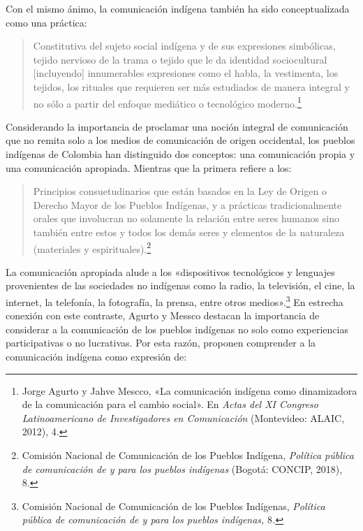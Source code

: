 \documentclass{tufte-handout}
\begin{document}
\noindent Con el mismo ánimo, la comunicación indígena también ha sido
conceptualizada como una práctica:

\begin{quote}
Constitutiva del sujeto social indígena y de sus expresiones simbólicas,
tejido nervioso de la trama o tejido que le da identidad sociocultural
{[}incluyendo{]} innumerables expresiones como el habla, la vestimenta,
los tejidos, los rituales que requieren ser más estudiados de manera
integral y no sólo a partir del enfoque mediático o tecnológico
moderno.\footnote{Jorge Agurto y Jahve Mescco, «La comunicación indígena
  como dinamizadora de la comunicación para el cambio social». En
  \emph{Actas del XI Congreso Latinoamericano de Investigadores en
  Comunicación} (Montevideo: ALAIC, 2012), 4.}
\end{quote}

\noindent Considerando la importancia de proclamar una noción integral de
comunicación que no remita solo a los medios de comunicación de origen
occidental, los pueblos indígenas de Colombia han distinguido dos
conceptos: una comunicación propia y una comunicación apropiada.
Mientras que la primera refiere a los:

\begin{quote}
Principios consuetudinarios que están basados en la Ley de Origen o
Derecho Mayor de los Pueblos Indígenas, y a prácticas tradicionalmente
orales que involucran no solamente la relación entre seres humanos sino
también entre estos y todos los demás seres y elementos de la naturaleza
(materiales y espirituales).\footnote{Comisión Nacional de Comunicación
  de los Pueblos Indígena, \emph{Política pública de comunicación de y
  para los pueblos indígenas} (Bogotá: CONCIP, 2018), 8.}
\end{quote}

\noindent La comunicación apropiada alude a los «dispositivos tecnológicos y
lenguajes provenientes de las sociedades no indígenas como la radio, la
televisión, el cine, la internet, la telefonía, la fotografía, la
prensa, entre otros medios».\footnote{Comisión Nacional de Comunicación
  de los Pueblos Indígenas, \emph{Política pública de comunicación de y
  para los pueblos indígenas,} 8\emph{.}} En estrecha conexión con este
contraste, Agurto y Messco destacan la importancia de considerar a la
comunicación de los pueblos indígenas no solo como experiencias
participativas o no lucrativas. Por esta razón, proponen comprender a la
comunicación indígena como expresión de:
\end{document}
